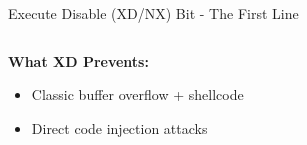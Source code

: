 \documentclass[aspectratio=169,12pt]{beamer}
\begin{document}
\begin{frame}{Execute Disable (XD/NX) Bit - The First Line}
\begin{columns}
\begin{column}{0.5\textwidth}
            
            \vspace{0.3cm}
            \textbf{What XD Prevents:}
            \begin{itemize}
                \item Classic buffer overflow + shellcode
                \item Direct code injection attacks
            \end{itemize}
        \end{column}
    \end{columns}
\end{frame}
\end{document}
